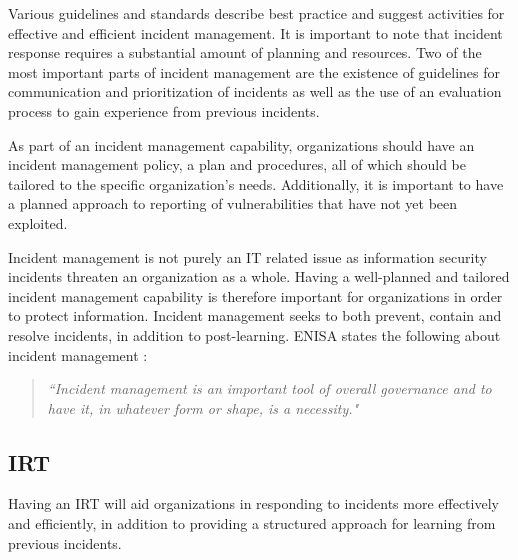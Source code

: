 Various guidelines and standards describe best practice and suggest activities for effective and efficient incident management. It is important to note that incident response requires a substantial amount of planning and resources. Two of the most important parts of incident management are the existence of guidelines for communication and prioritization of incidents as well as the use of an evaluation process to gain experience from previous incidents. \cite{nist800-61}

As part of an incident management capability, organizations should have an incident management policy, a plan and procedures, all of which should be tailored to the specific organization's needs. Additionally, it is important to have a planned approach to reporting of vulnerabilities that have not yet been exploited. \cite{ISO/IEC27035}



Incident management is not purely an IT related issue as information security incidents threaten an organization as a whole. Having a well-planned and tailored incident management capability is therefore important for organizations in order to protect information. Incident management seeks to both prevent, contain and resolve incidents, in addition to post-learning. ENISA states the following about incident management \cite{enisaGuide}: 

\begin{quote}
\textit{``Incident management is an important tool of overall governance and to have it, in whatever form or shape, is a necessity."}
\end{quote}

\subsection{\acl{IRT}}
Having an \ac{IRT} will aid organizations in responding to incidents more effectively and efficiently, in addition to providing a structured approach for learning from previous incidents. 


